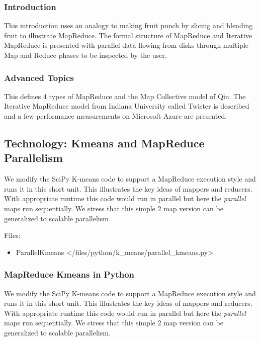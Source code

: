 \subsubsection{Introduction}\label{introduction}

This introduction uses an analogy to making fruit punch by slicing and
blending fruit to illustrate MapReduce. The formal structure of
MapReduce and Iterative MapReduce is presented with parallel data
flowing from disks through multiple Map and Reduce phases to be
inspected by the user.

\subsubsection{Advanced Topics}\label{advanced-topics}

This defines 4 types of MapReduce and the Map Collective model of Qiu.
The Iterative MapReduce model from Indiana University called Twister is
described and a few performance measurements on Microsoft Azure are
presented.

\subsection{Technology: Kmeans and MapReduce
Parallelism}\label{technology-kmeans-and-mapreduce-parallelism}

We modify the SciPy K-means code to support a MapReduce execution style
and runs it in this short unit. This illustrates the key ideas of
mappers and reducers. With appropriate runtime this code would run in
parallel but here the \emph{parallel} maps run sequentially. We stress
that this simple 2 map version can be generalized to scalable
parallelism.

Files:

\begin{itemize}

\item
  ParallelKmeans \textless{}/files/python/k\_means/parallel\_kmeans.py\textgreater{}
\end{itemize}

\subsubsection{MapReduce Kmeans in
Python}\label{mapreduce-kmeans-in-python}

We modify the SciPy K-means code to support a MapReduce execution style
and runs it in this short unit. This illustrates the key ideas of
mappers and reducers. With appropriate runtime this code would run in
parallel but here the \emph{parallel} maps run sequentially. We stress
that this simple 2 map version can be generalized to scalable
parallelism.


